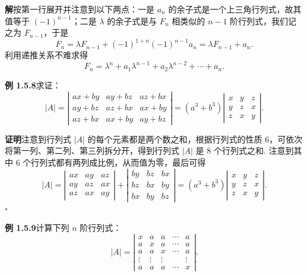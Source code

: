 \documentclass[UTF8,12pt,a4paper,fontset=fandol]{ctexart}
\begin{document}
\noindent\textbf{解}\quad 按第一行展开并注意到以下两点：一是 $a_n$ 的余子式是一个上三角行列式，故其值等于 $(-1)^{n-1}$；二是 $\lambda$ 的余子式是与 $F_n$ 相类似的 $n-1$ 阶行列式，我们记之为 $F_{n-1}$，于是
\[
F_n=\lambda F_{n-1}+(-1)^{1+n}(-1)^{n-1}a_n=\lambda F_{n-1}+a_n.
\]
利用递推关系不难求得
\[
F_n=\lambda^n+a_1\lambda^{n-1}+a_2\lambda^{n-2}+\cdots+a_n.
\]

\noindent\textbf{例 1.5.8}\quad 求证：
\[
|A|=
\left|\begin{array}{ccc}
ax+by & ay+bz & az+bx\\
ay+bz & az+bx & ax+by\\
az+bx & ax+by & ay+bz
\end{array}\right|
=(a^3+b^3)
\left|\begin{array}{ccc}
x & y & z\\
y & z & x\\
z & x & y
\end{array}\right|.
\]

\noindent\textbf{证明}\quad 注意到行列式 $|A|$ 的每个元素都是两个数之和，根据行列式的性质 6，可依次将第一列、第二列、第三列拆分开，得到行列式 $|A|$ 是 8 个行列式之和. 注意到其中 6 个行列式都有两列成比例，从而值为零，最后可得
\[
|A|=
\left|\begin{array}{ccc}
ax & ay & az\\
ay & az & ax\\
az & ax & ay
\end{array}\right|
+
\left|\begin{array}{ccc}
by & bz & bx\\
bz & bx & by\\
bx & by & bz
\end{array}\right|
=(a^3+b^3)
\left|\begin{array}{ccc}
x & y & z\\
y & z & x\\
z & x & y
\end{array}\right|.
\]
\(\square\)

\noindent\textbf{例 1.5.9}\quad 计算下列 $n$ 阶行列式：
\[
|A|=
\left|\begin{array}{ccccc}
x & a & a & \cdots & a\\
a & x & a & \cdots & a\\
a & a & x & \cdots & a\\
\vdots & \vdots & \vdots & & \vdots\\
a & a & a & \cdots & x
\end{array}\right|.
\]
\end{document}
